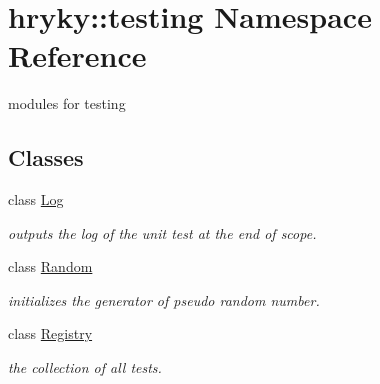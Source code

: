 \hypertarget{namespacehryky_1_1testing}{\section{hryky\-:\-:testing Namespace Reference}
\label{namespacehryky_1_1testing}
}


modules for testing  


\subsection*{Classes}
\begin{DoxyCompactItemize}
\item 
class \hyperlink{classhryky_1_1testing_1_1_log}{Log}
\begin{DoxyCompactList}\small\item\em outputs the log of the unit test at the end of scope. \end{DoxyCompactList}\item 
class \hyperlink{classhryky_1_1testing_1_1_random}{Random}
\begin{DoxyCompactList}\small\item\em initializes the generator of pseudo random number. \end{DoxyCompactList}\item 
class \hyperlink{classhryky_1_1testing_1_1_registry}{Registry}
\begin{DoxyCompactList}\small\item\em the collection of all tests. \end{DoxyCompactList}\end{DoxyCompactItemize}
